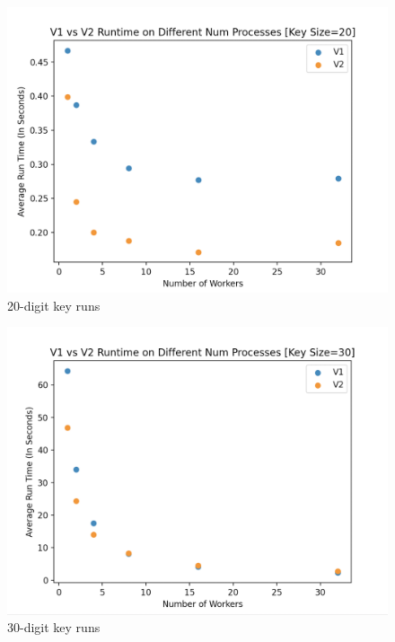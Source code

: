 \documentclass[11pt,twocolumn]{article}
\begin{document}
\begin{figure}[!htb]
    \centering
    \includegraphics[scale = 0.2]{20.png}
    \caption{20-digit key runs}
    \label{20dig}
\end{figure}

\begin{figure}[!htb]
    \centering
    \includegraphics[scale = 0.2]{30.png}
    \caption{30-digit key runs}
    \label{30dig}
\end{figure}
\end{document}
